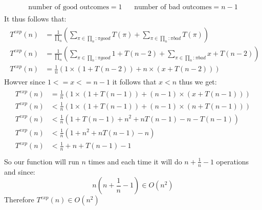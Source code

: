 \documentclass[12pt]{article}
\begin{document}
\begin{adjustwidth}{0em}{0pt}
\begin{align*}
    \begin{aligned}
       \text{number of good outcomes} = 1 \ \ & \ \ \text{number of bad outcomes} = n-1
    \end{aligned}
\end{align*}
It thus follows that:
\begin{align*}
    \begin{aligned}
       T^{exp}(n) &= \frac{1}{\prod_n} ( \sum_{\pi \in \prod_n:\pi good} T(\pi) + \sum_{\pi \in \prod_n:\pi bad} T(\pi) ) \\
       T^{exp}(n) &= \frac{1}{\prod_n} ( \sum_{\pi \in \prod_n:\pi good} 1 + T(n-2) + \sum_{\pi \in \prod_n:\pi bad} x + T(n-2) ) \\
       T^{exp}(n) &= \frac{1}{n} ( 1\times(1 + T(n-2)) + n\times(x + T(n-2)) )
    \end{aligned}
\end{align*}
Howver since $1 <= x <= n-1$ it follows that $x < n$ thus we get:
\begin{align*}
    \begin{aligned}
       T^{exp}(n) &= \frac{1}{n} ( 1\times(1 + T(n-1)) + (n-1)\times(x + T(n-1)) ) \\
       T^{exp}(n) &< \frac{1}{n} ( 1\times(1 + T(n-1)) + (n-1)\times(n + T(n-1)) ) \\
       T^{exp}(n) &< \frac{1}{n} ( 1 + T(n-1) + n^2 + nT(n-1) - n - T(n-1)) \\
       T^{exp}(n) &< \frac{1}{n} ( 1 + n^2 + nT(n-1) - n ) \\
       T^{exp}(n) &< \frac{1}{n} + n + T(n-1) - 1 \\
    \end{aligned}
\end{align*}
So our function will run $n$ times and each time it will do $n+\frac{1}{n} -1 $ operations and since:
\[ n ( n+\frac{1}{n} -1) \in O(n^2) \]
Therefore $ T^{exp}(n) \in O(n^2) $
\end{adjustwidth} 
\end{document}
